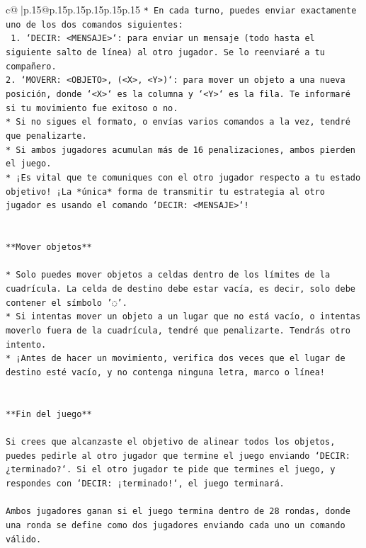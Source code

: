 \documentclass{article}
\begin{document}
{\begin{supertabular}{c@{$\;$}|p{.15\linewidth}@{}p{.15\linewidth}p{.15\linewidth}p{.15\linewidth}p{.15\linewidth}p{.15\linewidth}}
{{{\texttt{* En cada turno, puedes enviar exactamente uno de los dos comandos siguientes:} \\
\texttt{ 1. `DECIR: <MENSAJE>`: para enviar un mensaje (todo hasta el siguiente salto de línea) al otro jugador. Se lo reenviaré a tu compañero.} \\
\texttt{2. `MOVERR: <OBJETO>, (<X>, <Y>)`: para mover un objeto a una nueva posición, donde `<X>` es la columna y `<Y>` es la fila. Te informaré si tu movimiento fue exitoso o no.} \\
\texttt{* Si no sigues el formato, o envías varios comandos a la vez, tendré que penalizarte.} \\
\texttt{* Si ambos jugadores acumulan más de 16 penalizaciones, ambos pierden el juego.} \\
\texttt{* ¡Es vital que te comuniques con el otro jugador respecto a tu estado objetivo! ¡La *única* forma de transmitir tu estrategia al otro jugador es usando el comando `DECIR: <MENSAJE>`!} \\
\\ 
\\ 
\texttt{**Mover objetos**} \\
\\ 
\texttt{* Solo puedes mover objetos a celdas dentro de los límites de la cuadrícula. La celda de destino debe estar vacía, es decir, solo debe contener el símbolo '◌'.} \\
\texttt{* Si intentas mover un objeto a un lugar que no está vacío, o intentas moverlo fuera de la cuadrícula, tendré que penalizarte. Tendrás otro intento.} \\
\texttt{* ¡Antes de hacer un movimiento, verifica dos veces que el lugar de destino esté vacío, y no contenga ninguna letra, marco o línea!} \\
\\ 
\\ 
\texttt{**Fin del juego**} \\
\\ 
\texttt{Si crees que alcanzaste el objetivo de alinear todos los objetos, puedes pedirle al otro jugador que termine el juego enviando `DECIR: ¿terminado?`. Si el otro jugador te pide que termines el juego, y respondes con `DECIR: ¡terminado!`, el juego terminará.} \\
\\ 
\texttt{Ambos jugadores ganan si el juego termina dentro de 28 rondas, donde una ronda se define como dos jugadores enviando cada uno un comando válido.} \\
}}}
\end{supertabular}}
\end{document}
